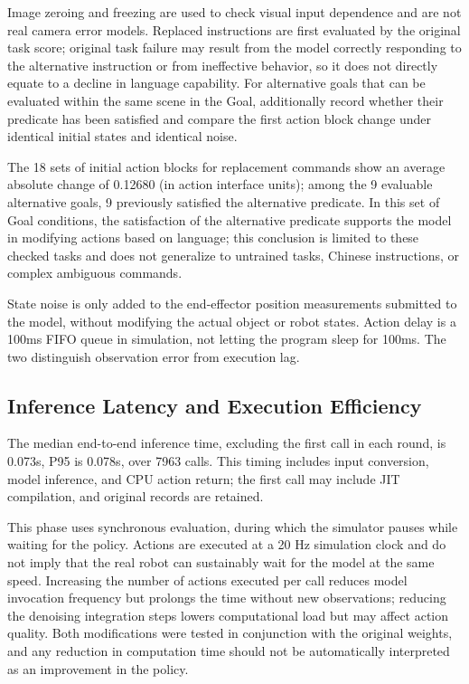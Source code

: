 Image zeroing and freezing are used to check visual input dependence and are not real camera error models. Replaced instructions are first evaluated by the original task score; original task failure may result from the model correctly responding to the alternative instruction or from ineffective behavior, so it does not directly equate to a decline in language capability. For alternative goals that can be evaluated within the same scene in the Goal, additionally record whether their predicate has been satisfied and compare the first action block change under identical initial states and identical noise.

The 18 sets of initial action blocks for replacement commands show an average absolute change of 0.12680 (in action interface units); among the 9 evaluable alternative goals, 9 previously satisfied the alternative predicate. In this set of Goal conditions, the satisfaction of the alternative predicate supports the model in modifying actions based on language; this conclusion is limited to these checked tasks and does not generalize to untrained tasks, Chinese instructions, or complex ambiguous commands.


State noise is only added to the end-effector position measurements submitted to the model, without modifying the actual object or robot states. Action delay is a 100ms FIFO queue in simulation, not letting the program sleep for 100ms. The two distinguish observation error from execution lag.

\subsection{Inference Latency and Execution Efficiency}\label{s08-detail-7}

The median end-to-end inference time, excluding the first call in each round, is 0.073s, P95 is 0.078s, over 7963 calls. This timing includes input conversion, model inference, and CPU action return; the first call may include JIT compilation, and original records are retained.

This phase uses synchronous evaluation, during which the simulator pauses while waiting for the policy. Actions are executed at a 20 Hz simulation clock and do not imply that the real robot can sustainably wait for the model at the same speed. Increasing the number of actions executed per call reduces model invocation frequency but prolongs the time without new observations; reducing the denoising integration steps lowers computational load but may affect action quality. Both modifications were tested in conjunction with the original weights, and any reduction in computation time should not be automatically interpreted as an improvement in the policy.

